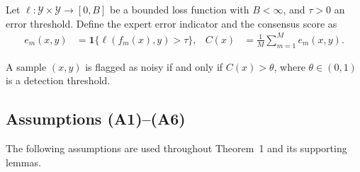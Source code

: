 Let $\ell : \mathcal{Y} \times \mathcal{Y} \to [0, B]$ be a bounded loss
function with $B < \infty$, and $\tau > 0$ an error threshold. Define the
expert error indicator and the consensus score as
\begin{align}
e_m(x, y) &= \mathbf{1}\{\ell(f_m(x), y) > \tau\}, &
C(x) &= \frac{1}{M}\sum_{m=1}^M e_m(x, y).
\label{eq:consensus-score}
\end{align}

\begin{definition}
\label{def:detection-rule}
A sample $(x,y)$ is flagged as noisy if and only if $C(x) > \theta$, where
$\theta \in (0,1)$ is a detection threshold.
\end{definition}

\subsection{Assumptions (A1)--(A6)}
\label{sec:thm1:assumptions}

The following assumptions are used throughout Theorem~1 and its supporting
lemmas.

